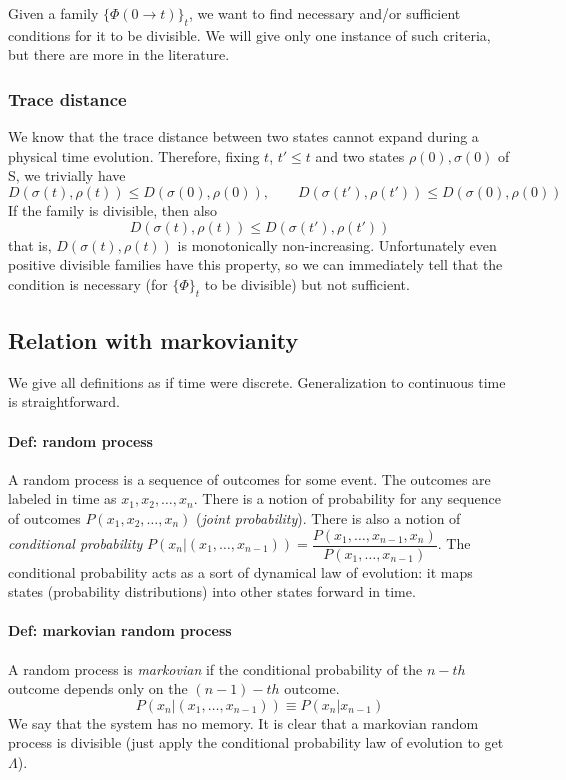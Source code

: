 \documentclass[a4paper, 11pt]{article}
\begin{document}
	Given a family $\{\Phi(0\rightarrow t)\}_t$, we want to find necessary and/or sufficient conditions for it to be divisible. We will give only one instance of such criteria, but there are more in the literature.
	\subsubsection{Trace distance}
	We know that the trace distance between two states cannot expand during a physical time evolution. Therefore, fixing $t$, $t'\le t$ and two states $\rho(0),\sigma(0)$ of S, we trivially have
	\[ D(\sigma(t), \rho(t)) \le D(\sigma(0), \rho(0)),\qquad D(\sigma(t'), \rho(t')) \le D(\sigma(0), \rho(0)) \]
	If the family is divisible, then also
	\[ D(\sigma(t), \rho(t)) \le D(\sigma(t'), \rho(t'))  \]
	that is, $D(\sigma(t), \rho(t))$ is monotonically non-increasing. Unfortunately even positive divisible families have this property, so we can immediately tell that the condition is necessary (for $\{\Phi\}_t$ to be divisible) but not sufficient.
	
	\subsection{Relation with markovianity}
	We give all definitions as if time were discrete. Generalization to continuous time is straightforward.
	\paragraph{Def: random process} A random process is a sequence of outcomes for some event. The outcomes are labeled in time as $x_1,x_2,\dots,x_n$. There is a notion of probability for any sequence of outcomes $P(x_1,x_2,\dots,x_n)$ (\emph{joint probability}). There is also a notion of \emph{conditional probability} $P(x_n|(x_1,\dots,x_{n-1})) = \dfrac{P(x_1,\dots,x_{n-1},x_n)}{P(x_1,\dots,x_{n-1})}$. The conditional probability acts as a sort of dynamical law of evolution: it maps states (probability distributions) into other states forward in time.
	
	\paragraph{Def: markovian random process} 
	A random process is \emph{markovian} if the conditional probability of the $n-th$ outcome depends only on the $(n-1)-th$ outcome.
	\[ P(x_n|(x_1,\dots,x_{n-1})) \equiv P(x_n|x_{n-1}) \]
	We say that the system has no memory. It is clear that a markovian random process is divisible (just apply the conditional probability law of evolution to get $\Lambda$).
	
\end{document}
